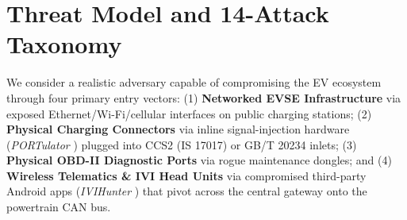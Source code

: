 \documentclass[conference]{IEEEtran}
\begin{document}
\section{Threat Model and 14-Attack Taxonomy}
We consider a realistic adversary capable of compromising the EV ecosystem through four primary entry vectors: (1) \textbf{Networked EVSE Infrastructure} via exposed Ethernet/Wi-Fi/cellular interfaces on public charging stations; (2) \textbf{Physical Charging Connectors} via inline signal-injection hardware (\textit{PORTulator} \cite{chen2025}) plugged into CCS2 (IS 17017) or GB/T 20234 inlets; (3) \textbf{Physical OBD-II Diagnostic Ports} via rogue maintenance dongles; and (4) \textbf{Wireless Telematics \& IVI Head Units} via compromised third-party Android apps (\textit{IVIHunter} \cite{xu2026}) that pivot across the central gateway onto the powertrain CAN bus.
\end{document}
